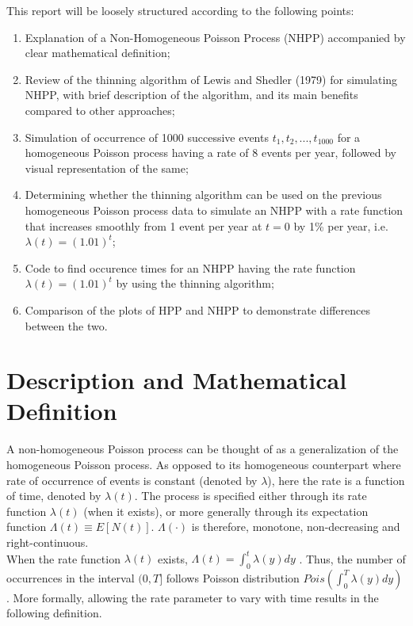 \documentclass[%
 reprint,
 amsmath,amssymb,
 aps,
]{revtex4-2}
\theoremstyle{definition}
\begin{document}
This report will be loosely structured according to the following points:
\begin{enumerate}
\item Explanation of a Non-Homogeneous Poisson Process (NHPP) accompanied by clear mathematical definition;
\item Review of the thinning algorithm of Lewis and Shedler (1979) \cite{lewis_shedler_1979} for simulating NHPP, with brief description of the algorithm, and its main benefits compared to other approaches;
\item Simulation of occurrence of 1000 successive events ${t_1, t_2, . . . , t_{1000}}$ for a homogeneous Poisson process having a rate of 8 events per year, followed by visual representation of the same;

\item Determining whether the thinning algorithm can be used on the previous homogeneous Poisson process data to simulate an NHPP with a rate function that increases smoothly from 1 event per year at $t = 0$ by 1\% per year, i.e. $\lambda(t) = (1.01)^t$;
\item Code to find occurence times for an NHPP having the rate function $\lambda(t) = (1.01)^t$ by using the thinning algorithm;
\item Comparison of the plots of HPP and NHPP to demonstrate differences between the two.

\end{enumerate}

\section{\label{q:1}Description and Mathematical Definition}
A non-homogeneous Poisson process can be thought of as a generalization of the homogeneous Poisson process. As opposed to its homogeneous counterpart where rate of occurrence of events is constant (denoted by $\lambda$), here the rate is a function of time, denoted by $\lambda(t)$. The process is specified either through its rate function $\lambda(t)$ (when it exists), or more generally through its expectation function $\Lambda(t) \equiv  E[N(t)]$. $\Lambda(\cdot)$ is therefore, monotone, non-decreasing and right-continuous. \\

When the rate function $\lambda(t)$ exists, $\Lambda(t) = \int_{0}^{t}\lambda(y) dy$ \cite{pasupathy}. Thus, the number of occurrences in the interval $(0,T]$ follows Poisson distribution $Pois(\int_{0}^{T}\lambda(y)dy)$ \cite{chen}. More formally, allowing the rate parameter to vary with time results in the following definition.
\end{document}
